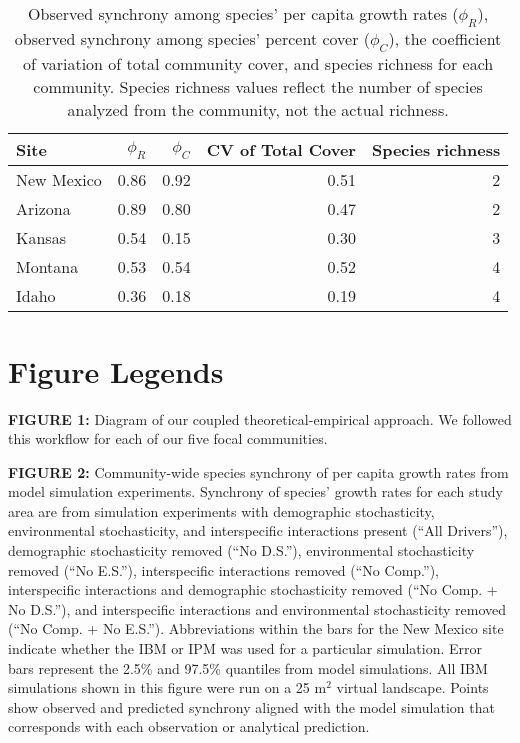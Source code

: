 \documentclass[12pt,]{article}
\begin{document}
\normalsize

\pagebreak{}

\begin{table}[ht]
\centering
\caption{Observed synchrony among species' per capita growth rates ($\phi_{R}$), observed synchrony among species' percent cover ($\phi_{C}$), the coefficient of variation of total community cover, and species richness for each community. Species richness values reflect the number of species analyzed from the community, not the actual richness.} 
\begingroup\normalsize
\begin{tabular}{lrrrr}
  \hline
Site & $\phi_{R}$ & $\phi_{C}$ & CV of Total Cover & Species richness \\ 
  \hline
New Mexico & 0.86 & 0.92 & 0.51 &   2 \\ 
  Arizona & 0.89 & 0.80 & 0.47 &   2 \\ 
  Kansas & 0.54 & 0.15 & 0.30 &   3 \\ 
  Montana & 0.53 & 0.54 & 0.52 &   4 \\ 
  Idaho & 0.36 & 0.18 & 0.19 &   4 \\ 
   \hline
\end{tabular}
\endgroup
\end{table}

\pagebreak{}

\doublespacing

\section{Figure Legends}

\textbf{FIGURE 1:} Diagram of our coupled theoretical-empirical approach. We followed this workflow for each of our five focal communities.

\textbf{FIGURE 2:} Community-wide species synchrony of per capita growth rates from model simulation experiments. Synchrony of species' growth rates for each study area are from simulation experiments with demographic stochasticity, environmental stochasticity, and interspecific interactions present (``All Drivers''), demographic stochasticity removed (``No D.S.''), environmental stochasticity removed (``No E.S.''), interspecific interactions removed (``No Comp.''), interspecific interactions and demographic stochasticity removed (``No Comp. + No D.S.''), and interspecific interactions and environmental stochasticity removed (``No Comp. + No E.S.''). Abbreviations within the bars for the New Mexico site indicate whether the IBM or IPM was used for a particular simulation. Error bars represent the 2.5\% and 97.5\% quantiles from model simulations. All IBM simulations shown in this figure were run on a 25 $\text{m}^2$ virtual landscape. Points show observed and predicted synchrony aligned with the model simulation that corresponds with each observation or analytical prediction.
\end{document}
